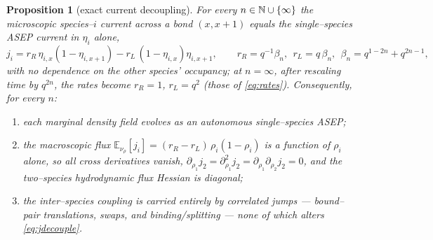 \documentclass[11pt]{article}
\theoremstyle{plain}
\newtheorem{proposition}[theorem]{Proposition}
\theoremstyle{definition}
\theoremstyle{remark}
\newcommand{\E}{\mathbb{E}}\newcommand{\PP}{\mathbb{P}}\newcommand{\dd}{\,\mathrm{d}}
\begin{document}
\begin{proposition}[exact current decoupling]\label{prop:decouple}
For every $n\in\mathbb{N}\cup\{\infty\}$ the microscopic species--$i$ current across a bond
$(x,x{+}1)$ equals the single--species ASEP current in $\eta_i$ alone,
\begin{equation}\label{eq:jdecouple}
  j_i=r_R\,\eta_{i,x}(1-\eta_{i,x+1})-r_L\,(1-\eta_{i,x})\eta_{i,x+1},
  \qquad r_R=q^{-1}\beta_n,\ \ r_L=q\,\beta_n,\ \ \beta_n=q^{1-2n}+q^{2n-1},
\end{equation}
with no dependence on the other species' occupancy; at $n=\infty$, after rescaling time
by $q^{2n}$, the rates become $r_R=1$, $r_L=q^2$ (those of \eqref{eq:rates}).
Consequently, for every $n$:
\begin{enumerate}
\item[\textup{(a)}] each marginal density field evolves as an \emph{autonomous}
single--species ASEP;
\item[\textup{(b)}] the macroscopic flux $\E_{\nu_\rho}[j_i]=(r_R-r_L)\,\rho_i(1-\rho_i)$
is a function of $\rho_i$ alone, so all cross derivatives vanish,
$\partial_{\rho_1}j_2=\partial^2_{\rho_1}j_2=\partial_{\rho_1}\partial_{\rho_2}j_2=0$,
and the two--species hydrodynamic flux Hessian is diagonal;
\item[\textup{(c)}] the inter--species coupling is carried entirely by correlated
jumps --- bound--pair translations, swaps, and binding/splitting --- none of which
alters \eqref{eq:jdecouple}.
\end{enumerate}
\end{proposition}
\end{document}

